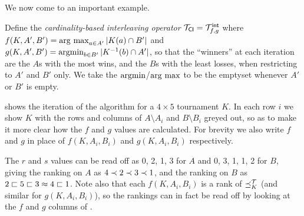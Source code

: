 We now come to an important example.

\begin{example}
    \label{tourn_ex_cardint}

    Define the \emph{cardinality-based interleaving operator} ${\mathcal{T}_{\mathsf{CI}}} =
    {\mathcal{T}_{f,g}^\mathsf{int}}$ where $f(K, A', B') = \operatorname*{arg\ max}_{a \in A'}{|K(a) \cap B'|}$ and
    \\  %
    $g(K, A', B') = \argmin_{b \in B'}{|K^{-1}(b) \cap A'|}$, so that the
    ``winners'' at each iteration are the $A$s with the most wins, and the $B$s
    with the least losses, when restricting to $A'$ and $B'$ only.  We take the
    $\argmin$/$\operatorname*{arg\ max}$ to be the emptyset whenever $A'$ or $B'$ is empty.

     shows the iteration of the algorithm for a $4
    \times 5$ tournament $K$. In each row $i$ we show $K$ with the rows and
    columns of $A \setminus A_i$ and $B \setminus B_i$ greyed out, so as to
    make it more clear how the $f$ and $g$ values are
    calculated.\footnotemark{} For brevity we also write $f$ and $g$ in place
    of $f(K, A_i, B_i)$ and $g(K, A_i, B_i)$ respectively.

    The $r$ and $s$ values can be read off as 0, 2, 1, 3 for $A$ and 0, 3, 1,
    1, 2 for $B$, giving the ranking on $A$ as $4 \prec 2 \prec 3 \prec 1$, and
    the ranking on $B$ as $2 \sqsubset 5 \sqsubset 3 \approx 4 \sqsubset 1$. Note also that each
    $f(K, A_i, B_i)$ is a rank of $\preceq_K^{\mathcal{T}}$ (and similar for $g(K, A_i,
    B_i)$), so the rankings can in fact be read off by looking at the $f$ and
    $g$ columns of .


\end{example}

